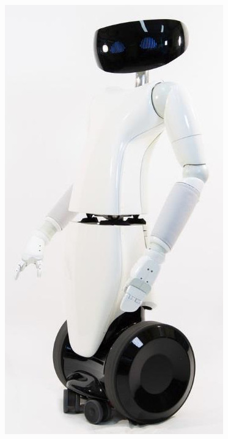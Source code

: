 \documentclass[11pt,a4paper]{report}
\begin{document}
\begin{figure}
    \centering
    \vspace{-10pt}
    \includegraphics[width=\linewidth]{R1-profile}
    \label{fig|R1}
\end{figure}
\end{document}
